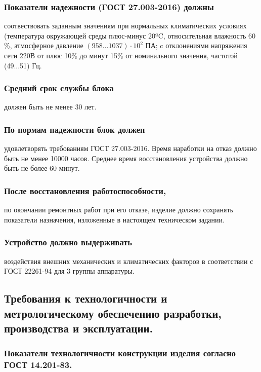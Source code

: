 \documentclass[a4paper]{bsuir-tor}
\begin{document}
\subsubsection{Показатели надежности (ГОСТ 27.003-2016) должны}
соотвествовать заданным значениям при нормальных климатических
условиях (температура окружающей среды плюс-минус 20ºC, относительная
влажность 60 \%, атмосферное давление $(958...1037) \cdot  10^2$ ПА;
c отклонениями напряжения сети 220В от плюс 10\% до минут 15\%
от номинального значения, частотой (49...51) Гц.

\subsubsection{Средний срок службы блока }
 должен быть не менее 30 лет.

 \subsubsection{ По нормам надежности блок должен }
 удовлетворять требованиям ГОСТ 27.003-2016. Время наработки на отказ
 должно быть не менее 10000 часов. Среднее время восстановления
 устройства должно быть не более 60 минут.
 
 \subsubsection{После восстановления работоспособности, }
 по окончании ремонтных работ при его отказе, изделие
 должно сохранять показатели назначения, изложенные в настоящем
 техническом задании.

 \subsubsection{Устройство должно выдерживать}
 воздействия внешних
 механических и климатических факторов в соответствии с ГОСТ 22261-94
 для 3 группы аппаратуры.

 \subsection{Требования к технологичности и
   метрологическому обеспечению разработки,
   производства и эксплуатации.}

 \subsubsection{Показатели технологичности конструкции изделия согласно ГОСТ 14.201-83.}
 
\end{document}
